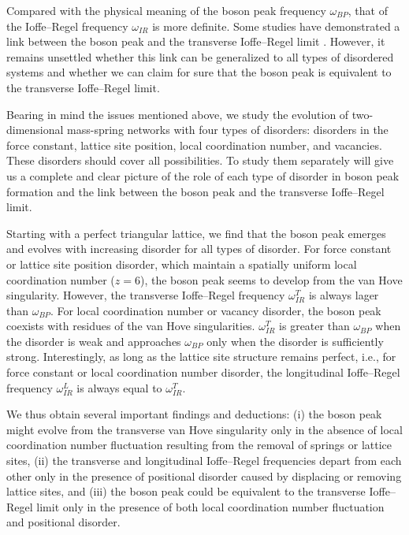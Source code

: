 \documentclass[twocolumn,printnumbers,amsmath,amssymb,prl,verbatim]{revtex4}
\begin{document}
Compared with the physical meaning of the boson peak frequency $\omega_{BP}$, that of the Ioffe--Regel frequency $\omega_{IR}$ is more definite. Some studies have demonstrated a link between the boson peak and the transverse Ioffe--Regel limit \cite{shintani,beltukov}. However, it remains unsettled whether this link can be generalized to all types of disordered systems and whether we can claim for sure that the boson peak is equivalent to the transverse Ioffe--Regel limit.

Bearing in mind the issues mentioned above, we study the evolution of two-dimensional mass-spring networks with four types of disorders: disorders in the force constant, lattice site position, local coordination number, and vacancies. These disorders should cover all possibilities. To study them separately will give us a complete and clear picture of the role of each type of disorder in boson peak formation and the link between the boson peak and the transverse Ioffe--Regel limit.

Starting with a perfect triangular lattice, we find that the boson peak emerges and evolves with increasing disorder for all types of disorder. For force constant or lattice site position disorder, which maintain a spatially uniform local coordination number ($z=6$), the boson peak seems to develop from the van Hove singularity. However, the transverse Ioffe--Regel frequency $\omega_{IR}^T$ is always lager than $\omega_{BP}$. For local coordination number or vacancy disorder, the boson peak coexists with residues of the van Hove singularities. $\omega_{IR}^T$ is greater than $\omega_{BP}$ when the disorder is weak and approaches $\omega_{BP}$ only when the disorder is sufficiently strong. Interestingly, as long as the lattice site structure remains perfect, i.e., for force constant or local coordination number disorder, the longitudinal Ioffe--Regel frequency $\omega_{IR}^L$ is always equal to $\omega_{IR}^T$.

We thus obtain several important findings and deductions: (i) the boson peak might evolve from the transverse van Hove singularity only in the absence of local coordination number fluctuation resulting from the removal of springs or lattice sites, (ii) the transverse and longitudinal Ioffe--Regel frequencies depart from each other only in the presence of positional disorder caused by displacing or removing lattice sites, and (iii) the boson peak could be equivalent to the transverse Ioffe--Regel limit only in the presence of both local coordination number fluctuation and positional disorder.
\end{document}
